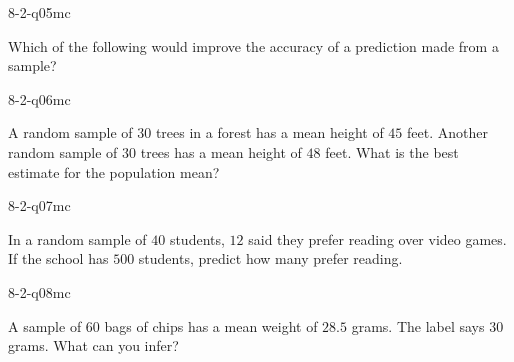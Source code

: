 \begin{practiceQuestion}{8-2-q05}{mc}
\begin{questionText}
Which of the following would improve the accuracy of a prediction made from a sample?
\end{questionText}
\end{practiceQuestion}

\begin{practiceQuestion}{8-2-q06}{mc}
\begin{questionText}
A random sample of $30$ trees in a forest has a mean height of $45$ feet. Another random sample of $30$ trees has a mean height of $48$ feet. What is the best estimate for the population mean?
\end{questionText}
\end{practiceQuestion}

\begin{practiceQuestion}{8-2-q07}{mc}
\begin{questionText}
In a random sample of $40$ students, $12$ said they prefer reading over video games. If the school has $500$ students, predict how many prefer reading.
\end{questionText}
\end{practiceQuestion}

\begin{practiceQuestion}{8-2-q08}{mc}
\begin{questionText}
A sample of $60$ bags of chips has a mean weight of $28.5$ grams. The label says $30$ grams. What can you infer?
\end{questionText}
\end{practiceQuestion}

